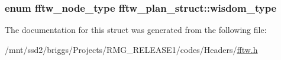 \hypertarget{structfftw__plan__struct_ab5226ce275144b46887c740ab90b79dd}{
\subsubsection[{wisdom\-\_\-type}]{\setlength{\rightskip}{0pt plus 5cm}enum {\bf fftw\-\_\-node\-\_\-type} fftw\-\_\-plan\-\_\-struct\-::wisdom\-\_\-type}}\label{structfftw__plan__struct_ab5226ce275144b46887c740ab90b79dd}


The documentation for this struct was generated from the following file\-:\begin{DoxyCompactItemize}
\item 
/mnt/ssd2/briggs/\-Projects/\-R\-M\-G\-\_\-\-R\-E\-L\-E\-A\-S\-E1/codes/\-Headers/\hyperlink{fftw_8h}{fftw.\-h}\end{DoxyCompactItemize}
